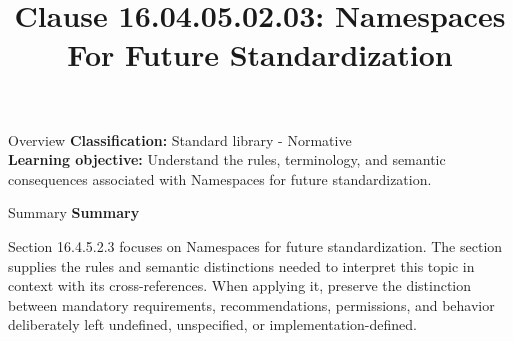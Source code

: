 \documentclass[10pt,letterpaper]{article}
\title{Clause 16.04.05.02.03: Namespaces For Future Standardization}
\author{}
\date{}
\begin{document}
\maketitle
\begin{CornellOverviewBox}{Overview}
\textbf{Classification:} Standard library - Normative\\[2pt]
\textbf{Learning objective:} Understand the rules, terminology, and semantic consequences associated with Namespaces for future standardization.
\end{CornellOverviewBox}\begin{CornellSummaryBox}{Summary}
{\sffamily\bfseries\color{Accent} Summary}\par\vspace{3pt}Section 16.4.5.2.3 focuses on Namespaces for future standardization. The section supplies the rules and semantic distinctions needed to interpret this topic in context with its cross-references. When applying it, preserve the distinction between mandatory requirements, recommendations, permissions, and behavior deliberately left undefined, unspecified, or implementation-defined.
\end{CornellSummaryBox}
\end{document}
